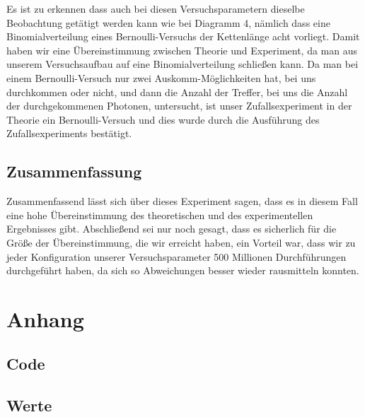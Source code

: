 Es ist zu erkennen dass auch bei diesen Versuchsparametern dieselbe Beobachtung getätigt werden kann wie bei Diagramm 4, nämlich dass eine Binomialverteilung eines Bernoulli-Versuchs der Kettenlänge acht vorliegt.
Damit haben wir eine Übereinstimmung zwischen Theorie und Experiment, da man aus unserem Versuchsaufbau auf eine Binomialverteilung schließen kann. Da man bei einem Bernoulli-Versuch nur zwei Auskomm-Möglichkeiten hat, bei uns durchkommen oder nicht, und dann die Anzahl der Treffer, bei uns die Anzahl der durchgekommenen Photonen, untersucht, ist unser Zufallsexperiment in der Theorie ein Bernoulli-Versuch und dies wurde durch die Ausführung des Zufallsexperiments bestätigt.



\subsection{Zusammenfassung}
Zusammenfassend lässt sich über dieses Experiment sagen, dass es in diesem Fall eine hohe Übereinstimmung des theoretischen und des experimentellen Ergebnisses gibt. Abschließend  sei nur noch gesagt, dass es sicherlich für die Größe der Übereinstimmung, die wir erreicht haben, ein Vorteil war, dass wir zu jeder Konfiguration unserer Versuchsparameter 500 Millionen Durchführungen durchgeführt haben, da sich so Abweichungen besser wieder rausmitteln konnten.

\clearpage
\section{Anhang}

\subsection{Code}



\subsection{Werte}

